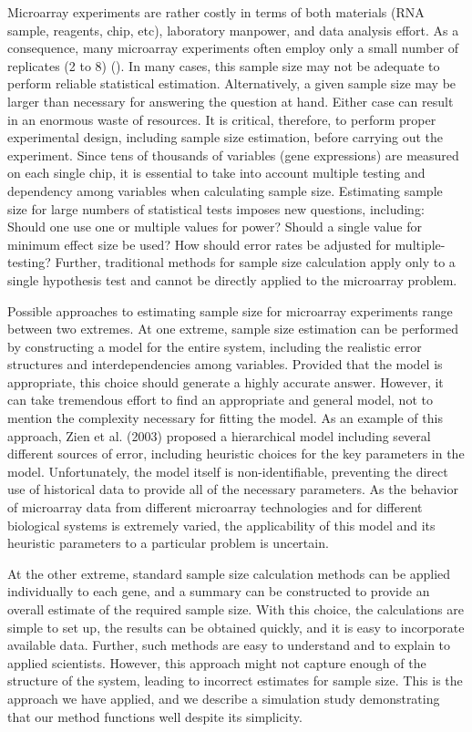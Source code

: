 \documentclass{bioinfo}
\begin{document}
Microarray experiments are rather costly in terms of both
materials (RNA sample, reagents, chip, etc), laboratory manpower,
and data analysis effort.  As a consequence, many microarray
experiments often employ only a small number of replicates (2 to
8) (\citealp{Speed03}). In many cases, this sample size may not be
adequate to perform reliable statistical estimation.
Alternatively, a given sample size may be larger than necessary
for answering the question at hand.  Either case can result in an
enormous waste of resources. It is critical, therefore, to perform
proper experimental design, including sample size estimation,
before carrying out the experiment. Since tens of thousands of
variables (gene expressions) are measured on each single chip, it
is essential to take into account multiple testing and dependency
among variables when calculating sample size.  Estimating sample
size for large numbers of statistical tests imposes new questions,
including: Should one use one or multiple values for power? Should
a single value for minimum effect size be used?  How should error
rates be adjusted for multiple-testing?  Further, traditional
methods for sample size calculation apply only to a single
hypothesis test and cannot be directly applied to the microarray
problem.

Possible approaches to estimating sample size for microarray
experiments range between two extremes. At one extreme, sample size
estimation can be performed by constructing a model for the entire
system, including the realistic error structures and
interdependencies among variables. Provided that the model is
appropriate, this choice should generate a highly accurate answer.
However, it can take tremendous effort to find an appropriate and
general model, not to mention the complexity necessary for fitting
the model. As an example of this approach, Zien et al. (2003)
proposed a hierarchical model including several different sources of
error, including heuristic choices for the key parameters in the
model. Unfortunately, the model itself is non-identifiable,
preventing the direct use of historical data to provide all of the
necessary parameters.  As the behavior of microarray data from
different microarray technologies and for different biological
systems is extremely varied, the applicability of this model and its
heuristic parameters to a particular problem is uncertain.

At the other extreme, standard sample size calculation methods can
be applied individually to each gene, and a summary can be
constructed to provide an overall estimate of the required sample
size.  With this choice, the calculations are simple to set up,
the results can be obtained quickly, and it is easy to incorporate
available data. Further, such methods are easy to understand and
to explain to applied scientists.  However, this approach might
not capture enough of the structure of the system, leading to
incorrect estimates for sample size.  This is the approach we have
applied, and we describe a simulation study demonstrating that our
method functions well despite its simplicity.
\end{document}

